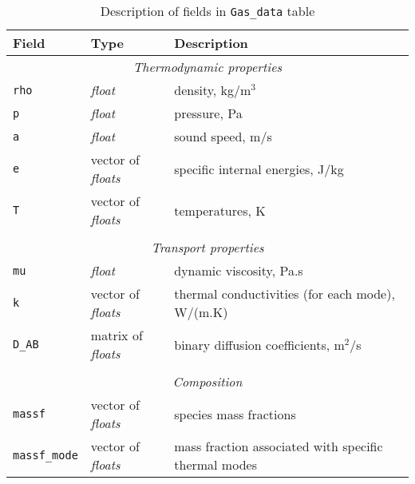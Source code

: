 \begin{table}
 \begin{center}
  \caption{Description of fields in \texttt{Gas\_data} table}
  \label{tab:gas-data}
\begin{tabular}{llp{6cm}}
 \hline \hline
 Field        & Type            &  Description \\ \hline
\multicolumn{3}{c}{\emph{Thermodynamic properties}} \\
\texttt{rho}  & \textit{float}  &  density, kg/m$^3$ \\
\texttt{p}    & \textit{float}  &  pressure, Pa \\
\texttt{a}    & \textit{float}  &  sound speed, m/s \\
\texttt{e}    & vector of \textit{floats} & specific internal energies, J/kg \\
\texttt{T}    & vector of \textit{floats} & temperatures, K \\
              &                           &                 \\
\multicolumn{3}{c}{\emph{Transport properties}} \\
\texttt{mu}   & \textit{float}  &  dynamic viscosity, Pa.s \\
\texttt{k}    & vector of \textit{floats} & thermal conductivities (for each mode), W/(m.K) \\
\texttt{D\_AB} & matrix of \textit{floats} & binary diffusion coefficients, m$^2$/s \\
              &                 &             \\
\multicolumn{3}{c}{\emph{Composition}} \\
\texttt{massf} & vector of \textit{floats} & species mass fractions \\
\texttt{massf\_mode} & vector of \textit{floats} & mass fraction associated with specific thermal modes \\ \hline
\end{tabular}
\end{center}
\end{table}

